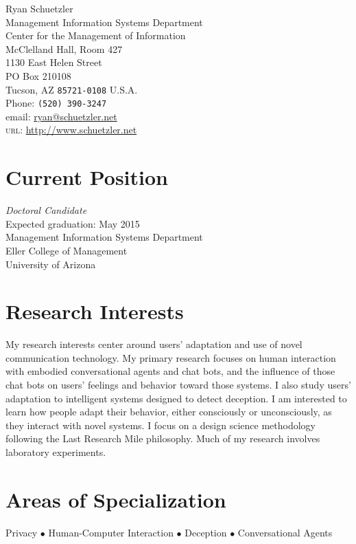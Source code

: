 \documentclass[10pt, a4paper]{article}
\begin{document}
{\LARGE Ryan Schuetzler}\\[1cm]
 Management Information Systems Department\\
 Center for the Management of Information\\
 McClelland Hall, Room 427\\
 1130 East Helen Street\\
 PO Box 210108\\
 Tucson, AZ \texttt{85721-0108}
U.S.A.\\[.2cm]
Phone: \texttt{(520) 390-3247}\\[.2cm]
email: \href{mailto:ryan@schuetzler.net}{ryan@schuetzler.net}\\
\textsc{url}: \href{http://www.schuetzler.net}{http://www.schuetzler.net}\\ 

\section*{Current Position}
\emph{Doctoral Candidate}\\
Expected graduation: May 2015\\
Management Information Systems Department\\
Eller College of Management\\
University of Arizona


\section*{Research Interests}

My research interests center around users' adaptation and use of novel
communication technology. My primary research focuses on human interaction with
embodied conversational agents and chat bots, and the influence of those chat
bots on users' feelings and behavior toward those systems. I also study users'
adaptation to intelligent systems designed to detect deception. I am interested
to learn how people adapt their behavior, either consciously or unconsciously,
as they interact with novel systems. I focus on a design science methodology
following the Last Research Mile philosophy. Much of my research involves
laboratory experiments.

\section*{Areas of Specialization}
Privacy $\bullet$ Human-Computer Interaction $\bullet$ Deception $\bullet$
Conversational Agents
\end{document}

